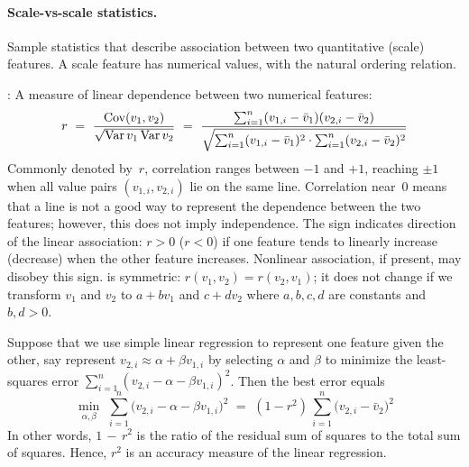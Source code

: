 \paragraph{Scale-vs-scale statistics.}
Sample statistics that describe association between two quantitative (scale) features.
A scale feature has numerical values, with the natural ordering relation.
\begin{Description}
\item[\it\NameStatR]:
A measure of linear dependence between two numerical features:
\begin{equation*}
r \,\,=\,\, \frac{\Cov(v_1, v_2)}{\sqrt{\Var v_1 \Var v_2}}
\,\,=\,\, \frac{\sum_{i=1}^n (v_{1,i} - \bar{v}_1) (v_{2,i} - \bar{v}_2)}%
{\sqrt{\sum_{i=1}^n (v_{1,i} - \bar{v}_1)^{2\mathstrut} \cdot \sum_{i=1}^n (v_{2,i} - \bar{v}_2)^{2\mathstrut}}}
\end{equation*}
Commonly denoted by~$r$, correlation ranges between $-1$ and $+1$, reaching ${\pm}1$ when all value
pairs $(v_{1,i}, v_{2,i})$ lie on the same line.  Correlation near~0 means that a line is not a good
way to represent the dependence between the two features; however, this does not imply independence.
The sign indicates direction of the linear association: $r > 0$ ($r < 0$) if one feature tends to
linearly increase (decrease) when the other feature increases.  Nonlinear association, if present,
may disobey this sign.
\NameStatR{} is symmetric: $r(v_1, v_2) = r(v_2, v_1)$; it does not change if we transform $v_1$ and $v_2$
to $a + b v_1$ and $c + d v_2$ where $a, b, c, d$ are constants and $b, d > 0$.

Suppose that we use simple linear regression to represent one feature given the other, say
represent $v_{2,i} \approx \alpha + \beta v_{1,i}$ by selecting $\alpha$ and $\beta$
to minimize the least-squares error $\sum_{i=1}^n (v_{2,i} - \alpha - \beta v_{1,i})^2$.
Then the best error equals
\begin{equation*}
\min_{\alpha, \beta} \,\,\sum_{i=1}^n \big(v_{2,i} - \alpha - \beta v_{1,i}\big)^2 \,\,=\,\,
(1 - r^2) \,\sum_{i=1}^n \big(v_{2,i} - \bar{v}_2\big)^2
\end{equation*}
In other words, $1\,{-}\,r^2$ is the ratio of the residual sum of squares to
the total sum of squares.  Hence, $r^2$ is an accuracy measure of the linear regression.
\end{Description}



